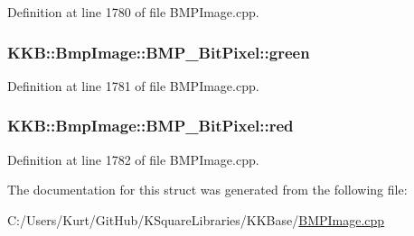 Definition at line 1780 of file B\+M\+P\+Image.\+cpp.

\subsubsection[{\texorpdfstring{green}{green}}]{ K\+K\+B\+::\+Bmp\+Image\+::\+B\+M\+P\+\_\+Bit\+Pixel\+::green}\hypertarget{struct_bmp_image_1_1_b_m_p__24_bit_pixel_a481cbfde1fd52e11ebc0363ec953c314}{}\label{struct_bmp_image_1_1_b_m_p__24_bit_pixel_a481cbfde1fd52e11ebc0363ec953c314}


Definition at line 1781 of file B\+M\+P\+Image.\+cpp.

\subsubsection[{\texorpdfstring{red}{red}}]{ K\+K\+B\+::\+Bmp\+Image\+::\+B\+M\+P\+\_\+Bit\+Pixel\+::red}\hypertarget{struct_bmp_image_1_1_b_m_p__24_bit_pixel_ab084ef96b61054bc302d602aea18f643}{}\label{struct_bmp_image_1_1_b_m_p__24_bit_pixel_ab084ef96b61054bc302d602aea18f643}


Definition at line 1782 of file B\+M\+P\+Image.\+cpp.



The documentation for this struct was generated from the following file\+:\begin{DoxyCompactItemize}
\item 
C\+:/\+Users/\+Kurt/\+Git\+Hub/\+K\+Square\+Libraries/\+K\+K\+Base/\hyperlink{_b_m_p_image_8cpp}{B\+M\+P\+Image.\+cpp}\end{DoxyCompactItemize}
